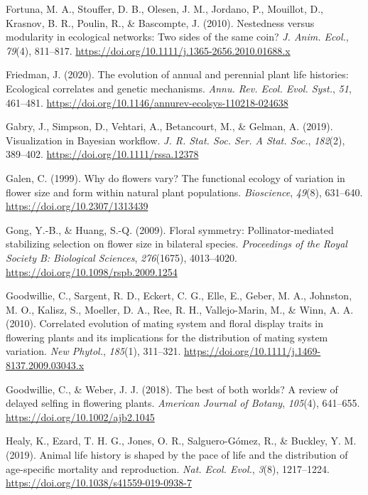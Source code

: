 \documentclass[
  12pt,
  a4paper,
]{article}
\newlength{\cslhangindent}
\newlength{\cslentryspacingunit} %
\newenvironment{CSLReferences}[2] %
 {%
  \setlength{\parindent}{0pt}
  \ifodd #1
  \let\oldpar\par
  \def\par{\hangindent=\cslhangindent\oldpar}
  \fi
  \setlength{\parskip}{#2\cslentryspacingunit}
 }%
 {}
\begin{document}
\begin{CSLReferences}{1}{0}
\leavevmode{}%
Fortuna, M. A., Stouffer, D. B., Olesen, J. M., Jordano, P., Mouillot, D., Krasnov, B. R., Poulin, R., \& Bascompte, J. (2010). Nestedness versus modularity in ecological networks: Two sides of the same coin? \emph{J. Anim. Ecol.}, \emph{79}(4), 811--817. \url{https://doi.org/10.1111/j.1365-2656.2010.01688.x}

\leavevmode{}%
Friedman, J. (2020). The evolution of annual and perennial plant life histories: Ecological correlates and genetic mechanisms. \emph{Annu. Rev. Ecol. Evol. Syst.}, \emph{51}, 461--481. \url{https://doi.org/10.1146/annurev-ecolsys-110218-024638}

\leavevmode{}%
Gabry, J., Simpson, D., Vehtari, A., Betancourt, M., \& Gelman, A. (2019). Visualization in {Bayesian} workflow. \emph{J. R. Stat. Soc. Ser. A Stat. Soc.}, \emph{182}(2), 389--402. \url{https://doi.org/10.1111/rssa.12378}

\leavevmode{}%
Galen, C. (1999). Why do flowers vary? The functional ecology of variation in flower size and form within natural plant populations. \emph{Bioscience}, \emph{49}(8), 631--640. \url{https://doi.org/10.2307/1313439}

\leavevmode{}%
Gong, Y.-B., \& Huang, S.-Q. (2009). Floral symmetry: Pollinator-mediated stabilizing selection on flower size in bilateral species. \emph{Proceedings of the Royal Society B: Biological Sciences}, \emph{276}(1675), 4013--4020. \url{https://doi.org/10.1098/rspb.2009.1254}

\leavevmode{}%
Goodwillie, C., Sargent, R. D., Eckert, C. G., Elle, E., Geber, M. A., Johnston, M. O., Kalisz, S., Moeller, D. A., Ree, R. H., Vallejo-Marin, M., \& Winn, A. A. (2010). Correlated evolution of mating system and floral display traits in flowering plants and its implications for the distribution of mating system variation. \emph{New Phytol.}, \emph{185}(1), 311--321. \url{https://doi.org/10.1111/j.1469-8137.2009.03043.x}

\leavevmode{}%
Goodwillie, C., \& Weber, J. J. (2018). The best of both worlds? A review of delayed selfing in flowering plants. \emph{American Journal of Botany}, \emph{105}(4), 641--655. \url{https://doi.org/10.1002/ajb2.1045}

\leavevmode{}%
Healy, K., Ezard, T. H. G., Jones, O. R., Salguero-Gómez, R., \& Buckley, Y. M. (2019). Animal life history is shaped by the pace of life and the distribution of age-specific mortality and reproduction. \emph{Nat. Ecol. Evol.}, \emph{3}(8), 1217--1224. \url{https://doi.org/10.1038/s41559-019-0938-7}


\end{CSLReferences}
\end{document}
